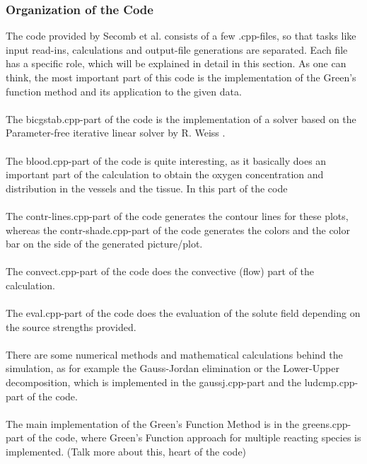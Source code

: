 \subsubsection*{Organization of the Code}

The code provided by Secomb et al. \cite{Secomb2004} consists of a few .cpp-files, so that tasks like input read-ins, calculations and output-file generations are separated. Each file has a specific role, which will be explained in detail in this section. As one can think, the most important part of this code is the implementation of the Green's function method and its application to the given data.
\\
\\The bicgstab.cpp-part of the code is the implementation of a solver based on the Parameter-free iterative linear solver by R. Weiss \cite{weiss1996parameter}.
\\
\\The blood.cpp-part of the code is quite interesting, as it basically does an important part of the calculation to obtain the oxygen concentration and distribution in the vessels and the tissue. In this part of the code
\\
\\The contr-lines.cpp-part of the code generates the contour lines for these plots, whereas the contr-shade.cpp-part of the code generates the colors and the color bar on the side of the generated picture/plot.
\\
\\The convect.cpp-part of the code does the convective (flow) part of the calculation.
\\
\\The eval.cpp-part of the code does the evaluation of the solute field depending on the source strengths provided.
\\
\\There are some numerical methods and mathematical calculations behind the simulation, as for example the Gauss-Jordan elimination or the Lower-Upper decomposition, which is implemented in the gaussj.cpp-part and the ludcmp.cpp-part of the code.
\\
\\The main implementation of the Green's Function Method is in the greens.cpp-part of the code, where Green's Function approach for multiple reacting species is implemented. (Talk more about this, heart of the code)

